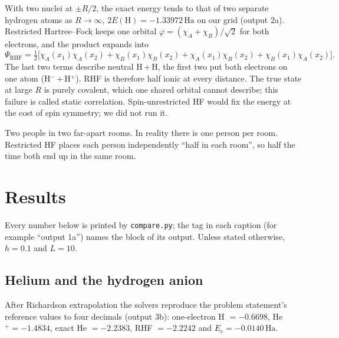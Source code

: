 \documentclass[11pt,a4paper]{article}
\newcommand{\Ha}{\ensuremath{\,\mathrm{Ha}}}
\begin{document}
With two nuclei at $\pm R/2$, the exact energy tends to that of two separate hydrogen atoms as $R\to\infty$,
$2E(\text{H})=-1.33972$\Ha{} on our grid (output 2a). Restricted Hartree--Fock keeps one orbital $\varphi=(\chi_A+\chi_B)/\sqrt2$ for both
electrons, and the product expands into
\begin{equation}
  \Psi_\text{RHF}=\tfrac12\big[\chi_A(x_1)\chi_A(x_2)+\chi_B(x_1)\chi_B(x_2)+\chi_A(x_1)\chi_B(x_2)+\chi_B(x_1)\chi_A(x_2)\big].
\end{equation}
The last two terms describe neutral H\,+\,H, the first two put both electrons on one atom (H$^-$\,+\,H$^+$). RHF
is therefore half ionic at every distance. The true state at large $R$ is purely covalent, which one shared
orbital cannot describe; this failure is called static correlation. Spin-unrestricted HF would fix the
energy at the cost of spin symmetry; we did not run it.

\begin{plainwords}
Two people in two far-apart rooms. In reality there is one person per room. Restricted HF places each person
independently ``half in each room'', so half the time both end up in the same room.
\end{plainwords}

\section{Results}\label{sec:results}

Every number below is printed by \texttt{compare.py}; the tag in each caption (for example ``output 1a'') names the
block of its output. Unless stated otherwise, $h=0.1$ and $L=10$.

\subsection{Helium and the hydrogen anion}

After Richardson extrapolation the solvers reproduce the problem statement's reference values to four decimals
(output 3b): one-electron H $=-0.6698$, He$^+=-1.4834$, exact He $=-2.2383$, RHF $=-2.2242$ and $E_c=-0.0140$\Ha.
\end{document}
